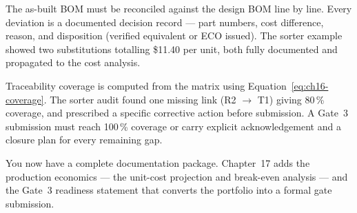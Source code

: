 The as-built BOM must be reconciled against the design BOM line by line.
Every deviation is a documented decision record --- part numbers, cost
difference, reason, and disposition (verified equivalent or ECO issued).
The sorter example showed two substitutions totalling \$11.40 per unit, both
fully documented and propagated to the cost analysis.

Traceability coverage is computed from the matrix using
Equation~\ref{eq:ch16-coverage}.
The sorter audit found one missing link (R2 $\to$ T1) giving 80\,\% coverage,
and prescribed a specific corrective action before submission.
A Gate~3 submission must reach 100\,\% coverage or carry explicit
acknowledgement and a closure plan for every remaining gap.

You now have a complete documentation package.
Chapter~17 adds the production economics --- the unit-cost projection and
break-even analysis --- and the Gate~3 readiness statement that converts the
portfolio into a formal gate submission.
